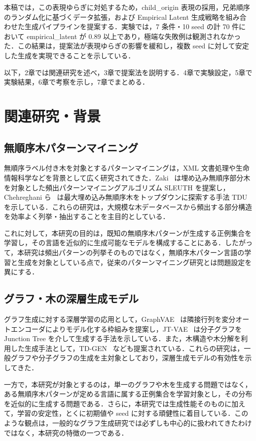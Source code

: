 \documentclass[submit,techrep,noauthor]{ipsj}
\begin{document}
本稿では，この表現ゆらぎに対処するため，child\_origin 表現の採用，兄弟順序のランダム化に基づくデータ拡張，および Empirical Latent 生成戦略を組み合わせた生成パイプラインを提案する．実験では，7 条件・10 seed の計 70 件において empirical\_latent が 0.89 以上であり，極端な失敗例は観測されなかった．この結果は，提案法が表現ゆらぎの影響を緩和し，複数 seed に対して安定した生成を実現できることを示している．

以下，2章では関連研究を述べ，3章で提案法を説明する．4章で実験設定，5章で実験結果，6章で考察を示し，7章でまとめる．

\section{関連研究・背景}

\subsection{無順序木パターンマイニング}

無順序ラベル付き木を対象とするパターンマイニングは，XML 文書処理や生命情報科学などを背景として広く研究されてきた．Zaki~\cite{zaki2005} は埋め込み無順序部分木を対象とした頻出パターンマイニングアルゴリズム SLEUTH を提案し，Chehreghani ら~\cite{chehreghani2007} は最大埋め込み無順序木をトップダウンに探索する手法 TDU を示している．これらの研究は，大規模な木データベースから頻出する部分構造を効率よく列挙・抽出することを主目的としている．

これに対して，本研究の目的は，既知の無順序木パターンが生成する正例集合を学習し，その言語を近似的に生成可能なモデルを構成することにある．したがって，本研究は頻出パターンの列挙そのものではなく，無順序木パターン言語の学習と生成を対象としている点で，従来のパターンマイニング研究とは問題設定を異にする．

\subsection{グラフ・木の深層生成モデル}

グラフ生成に対する深層学習の応用として，GraphVAE~\cite{simonovsky2018} は隣接行列を変分オートエンコーダによりモデル化する枠組みを提案し，JT-VAE~\cite{jin2018} は分子グラフを Junction Tree を介して生成する手法を示している．また，木構造や木分解を利用した生成手法として，TD-GEN~\cite{shirzad2022} なども提案されている．これらの研究は，一般グラフや分子グラフの生成を主対象としており，深層生成モデルの有効性を示してきた．

一方で，本研究が対象とするのは，単一のグラフや木を生成する問題ではなく，ある無順序木パターンが定める言語に属する正例集合を学習対象とし，その分布を近似的に生成する問題である．さらに，本研究では生成性能そのものに加えて，学習の安定性，とくに初期値や seed に対する頑健性に着目している．このような観点は，一般的なグラフ生成研究では必ずしも中心的に扱われてきたわけではなく，本研究の特徴の一つである．
\end{document}
